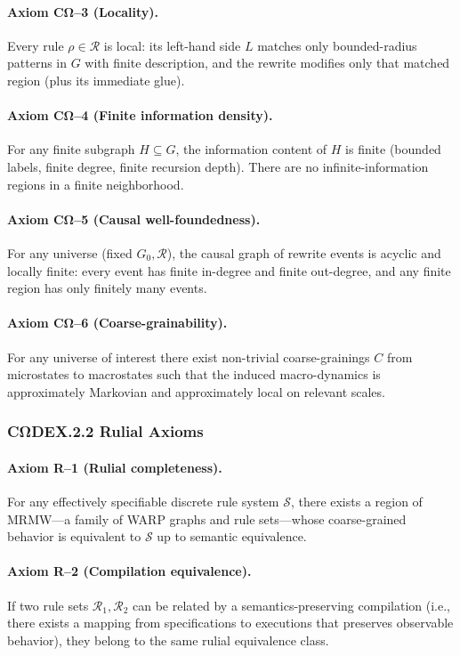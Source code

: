 \paragraph{Axiom CΩ–3 (Locality).}
Every rule $\rho \in \mathcal{R}$ is local: its left-hand side $L$ matches
only bounded-radius patterns in $G$ with finite description, and the
rewrite modifies only that matched region (plus its immediate glue).

\paragraph{Axiom CΩ–4 (Finite information density).}
For any finite subgraph $H \subseteq G$, the information content of $H$
is finite (bounded labels, finite degree, finite recursion depth). There
are no infinite-information regions in a finite neighborhood.

\paragraph{Axiom CΩ–5 (Causal well-foundedness).}
For any universe (fixed $G_0,\mathcal{R}$), the causal graph of rewrite
events is acyclic and locally finite: every event has finite in-degree
and finite out-degree, and any finite region has only finitely many events.

\paragraph{Axiom CΩ–6 (Coarse-grainability).}
For any universe of interest there exist non-trivial coarse-grainings
$C$ from microstates to macrostates such that the induced macro-dynamics
is approximately Markovian and approximately local on relevant scales.

\subsubsection*{CΩDEX.2.2 \quad Rulial Axioms}

\paragraph{Axiom R–1 (Rulial completeness).}
For any effectively specifiable discrete rule system $\mathcal{S}$, there
exists a region of MRMW—a family of WARP graphs and rule sets—whose coarse-grained
behavior is equivalent to $\mathcal{S}$ up to semantic equivalence.

\paragraph{Axiom R–2 (Compilation equivalence).}
If two rule sets $\mathcal{R}_1,\mathcal{R}_2$ can be related by a
semantics-preserving compilation (i.e., there exists a mapping from
specifications to executions that preserves observable behavior), they
belong to the same rulial equivalence class.

